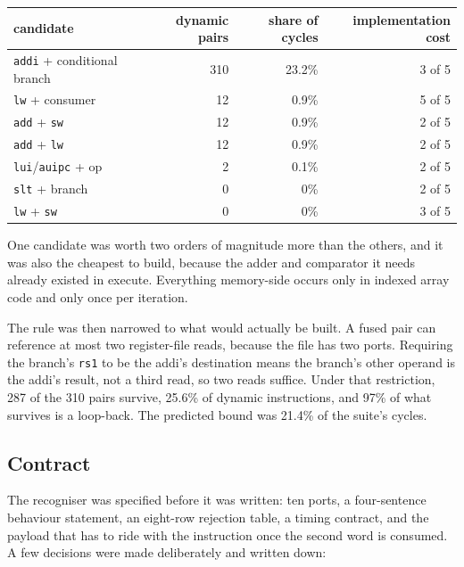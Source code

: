 \documentclass[11pt]{article}
\begin{document}
\begin{center}
\begin{tabular}{lrrr}
\toprule
candidate & dynamic pairs & share of cycles & implementation cost \\
\midrule
\texttt{addi} + conditional branch & 310 & 23.2\% & 3 of 5 \\
\texttt{lw} + consumer             & 12 & 0.9\% & 5 of 5 \\
\texttt{add} + \texttt{sw}          & 12 & 0.9\% & 2 of 5 \\
\texttt{add} + \texttt{lw}          & 12 & 0.9\% & 2 of 5 \\
\texttt{lui}/\texttt{auipc} + op    & 2 & 0.1\% & 2 of 5 \\
\texttt{slt} + branch               & 0 & 0\% & 2 of 5 \\
\texttt{lw} + \texttt{sw}           & 0 & 0\% & 3 of 5 \\
\bottomrule
\end{tabular}
\end{center}

One candidate was worth two orders of magnitude more than the others, and it was also the
cheapest to build, because the adder and comparator it needs already existed in execute.
Everything memory-side occurs only in indexed array code and only once per iteration.

The rule was then narrowed to what would actually be built. A fused pair can reference at most
two register-file reads, because the file has two ports. Requiring the branch's \texttt{rs1} to
be the addi's destination means the branch's other operand is the addi's result, not a third
read, so two reads suffice. Under that restriction, 287 of the 310 pairs survive, 25.6\% of
dynamic instructions, and 97\% of what survives is a loop-back. The predicted bound was 21.4\%
of the suite's cycles.

\subsection{Contract}

The recogniser was specified before it was written: ten ports, a four-sentence behaviour
statement, an eight-row rejection table, a timing contract, and the payload that has to ride
with the instruction once the second word is consumed. A few decisions were made deliberately
and written down:
\end{document}
